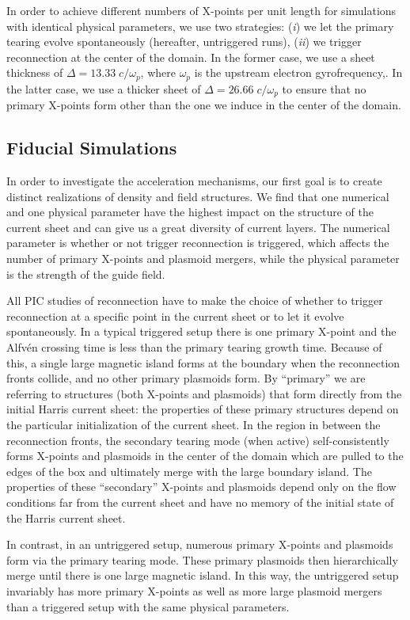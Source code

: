 In order to achieve different numbers of X-points per unit length for simulations with identical physical parameters, we use two strategies: (\textit{i}) we let the primary tearing evolve spontaneously (hereafter, untriggered runs), (\textit{ii}) we trigger reconnection at the center of the domain.  In the former case, we use a sheet thickness of $\Delta=13.33 \; c/\omega_{p}$, where $\omega_{p}$ is the upstream electron gyrofrequency,.  In the latter case, we use a thicker sheet of $\Delta=26.66 \; c/\omega_{p}$ to ensure that no primary X-points form other than the one we induce in the center of the domain.

\subsection{Fiducial Simulations}
In order to investigate the acceleration mechanisms, our first goal is to create distinct realizations of density and field structures.  We find that one numerical and one physical parameter have the highest impact on the structure of the current sheet and can give us a great diversity of current layers.  The numerical parameter is whether or not trigger reconnection is triggered, which affects the number of primary X-points and plasmoid mergers, while the physical parameter is the strength of the guide field. 

 All PIC studies of reconnection have to make the choice of whether to trigger reconnection at a specific point in the current sheet or to let it evolve spontaneously.  In a typical triggered setup there is one primary X-point and the Alfv\'en crossing time is less than the primary tearing growth time.  Because of this, a single large magnetic island forms at the boundary when the reconnection fronts collide, and no other primary plasmoids form.  By ``primary'' we are referring to structures (both X-points and plasmoids) that form directly from the initial Harris current sheet: the properties of these primary structures depend on the particular initialization of the current sheet.  In the region in between the reconnection fronts, the secondary tearing mode (when active) self-consistently forms X-points and plasmoids in the center of the domain which are pulled to the edges of the box and ultimately merge with the large boundary island.  The properties of these ``secondary'' X-points and plasmoids depend only on the flow conditions far from the current sheet and have no memory of the initial state of the Harris current sheet.  
 
 In contrast, in an untriggered setup, numerous primary X-points and plasmoids form via the primary tearing mode.  These primary plasmoids then hierarchically merge until there is one large magnetic island.  In this way, the untriggered setup invariably has more primary X-points as well as more large plasmoid mergers than a triggered setup with the same physical parameters.  

